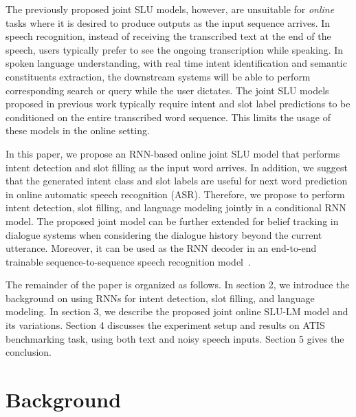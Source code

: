 \documentclass[11pt]{article}
\begin{document}
    The previously proposed joint SLU models, however, are unsuitable for \textit{online} tasks where it is desired to produce outputs as the input sequence arrives. In speech recognition, instead of receiving the transcribed text at the end of the speech, users typically prefer to see the ongoing transcription while speaking. In spoken language understanding, with real time intent identification and semantic constituents extraction, the downstream systems will be able to perform corresponding search or query while the user dictates. The joint SLU models proposed in previous work  typically require intent and slot label predictions to be conditioned on the entire transcribed word sequence. This limits the usage of these models in the online setting.

    In this paper, we propose an RNN-based online joint SLU model that performs intent detection and slot filling as the input word arrives. In addition, we suggest that the generated intent class and slot labels are useful for next word prediction in online automatic speech recognition (ASR). Therefore, we propose to perform intent detection, slot filling, and language modeling jointly in a conditional RNN model. The proposed joint model can be further extended for belief tracking in dialogue systems when considering the dialogue history beyond the current utterance. Moreover, it can be used as the RNN decoder in an end-to-end trainable sequence-to-sequence speech recognition model~\cite{jaitly:15}.
    
    The remainder of the paper is organized as follows. In section 2, we introduce the background on using RNNs for intent detection, slot filling, and language modeling. In section 3, we describe the proposed joint online SLU-LM model and its variations. Section 4 discusses the experiment setup and results on ATIS benchmarking task, using both text and noisy speech inputs. Section 5 gives the conclusion.

\section{Background}
\end{document}
